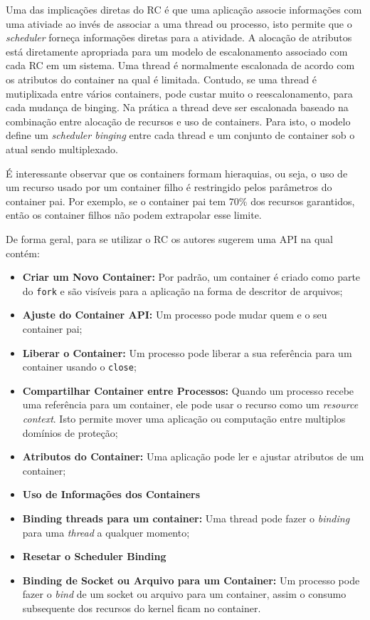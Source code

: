 Uma das implicações diretas do RC é que uma aplicação associe informações com
uma ativiade ao invés de associar a uma thread ou processo, isto permite que
o \emph{scheduler} forneça informações diretas para a atividade.
A alocação de atributos está diretamente apropriada para um modelo de
escalonamento associado com cada RC em um sistema. Uma thread é normalmente
escalonada de acordo com os atributos do container na qual é limitada. Contudo,
se uma thread é mutiplixada entre vários containers, pode custar muito o
reescalonamento, para cada mudança de binging. Na prática a thread deve ser
escalonada baseado na combinação entre alocação de recursos e uso de
containers. Para isto, o modelo define um \emph{scheduler binging} entre cada
thread e um conjunto de container sob o atual sendo multiplexado. 

É interessante observar que os containers formam hieraquias, ou seja, o uso de
um recurso usado por um container filho é restringido pelos parâmetros do
container pai. Por exemplo, se o container pai tem 70\% dos recursos
garantidos, então os container filhos não podem extrapolar esse limite.

De forma geral, para se utilizar o RC os autores sugerem uma API na qual
contém:
\begin{itemize}
	\item \textbf{Criar um Novo Container:} Por padrão, um container é criado
				como parte do \texttt{fork} e são visíveis para a aplicação na forma
				de descritor de arquivos;
	\item \textbf{Ajuste do Container API:} Um processo pode mudar quem e o seu
				container pai;
	\item \textbf{Liberar o Container:} Um processo pode liberar a sua referência
				para um container usando o \texttt{close};
	\item \textbf{Compartilhar Container entre Processos:} Quando um processo
				recebe uma referência para um container, ele pode usar o recurso como
				um \emph{resource context}. Isto permite mover uma aplicação ou
				computação entre multiplos domínios de proteção;
	\item \textbf{Atributos do Container:} Uma aplicação pode ler e ajustar
				atributos de um container;
	\item \textbf{Uso de Informações dos Containers}
	\item \textbf{Binding threads para um container:} Uma thread pode fazer o
				\emph{binding} para uma \emph{thread} a qualquer momento;
	\item \textbf{Resetar o Scheduler Binding}
	\item \textbf{Binding de Socket ou Arquivo para um Container:} Um processo
				pode fazer o \emph{bind} de um socket ou arquivo para um container,
				assim o consumo subsequente dos recursos do kernel ficam no container.
\end{itemize}

